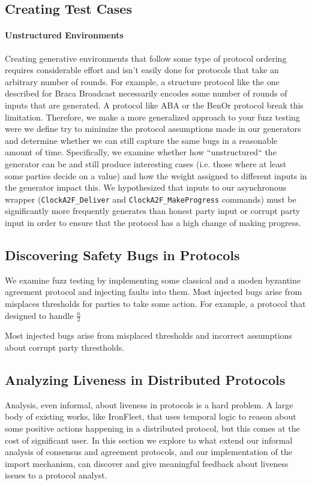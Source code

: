 \subsection{Creating Test Cases}

\paragraph{Unstructured Environments}
Creating generative environments that follow some type of protocol ordering requires considerable effort and isn't easily done for protocols that take an arbitrary number of rounds.
For example, a structure protocol like the one described for Braca Broadcast necessarily encodes some number of rounds of inputs that are generated. 
A protocol like ABA or the BenOr protocol break this limitation. 
Therefore, we make a more generalized approach to your fuzz testing were we define try to minimize the protocol assumptions made in our generators and determine
whether we can still capture the same bugs in a reasonable amount of time.
Specifically, we examine whether how ``unstructured`` the generator can be and still produce interesting cases (i.e. those where at least some parties decide on a value) and 
how the weight assigned to different inputs in the generator impact this.
We hypothesized that inputs to our asynchronous wrapper (\texttt{ClockA2F_Deliver} and \texttt{ClockA2F_MakeProgress} commands) must be significantly more frequently generates
than honest party input or corrupt party input in order to ensure that the protocol has a high change of making progress.





\subsection{Discovering Safety Bugs in Protocols}
We examine fuzz testing by implementing some classical and a moden byzantine agreement protocol and injecting faults into them.
Most injected bugs arise from misplaces thresholds for parties to take some action.
For example, a protocol that designed to handle $\frac{n}{2}$  

Most injected bugs arise from misplaced thresholds and incorrect assumptions about corrupt party threstholds. 



\subsection{Analyzing Liveness in Distributed Protocols}
Analysis, even informal, about liveness in protocols is a hard problem.
A large body of existing works, like IronFleet, that uses temporal logic to reason 
about some positive actions happening in a distributed protocol, but this comes at 
the cost of significant user.
In this section we explore to what extend our informal analysis of consensus and agreement
protocols, and our implementation of the import mechanism, can discover and give meaningful
feedback about liveness issues to a protocol analyst.

